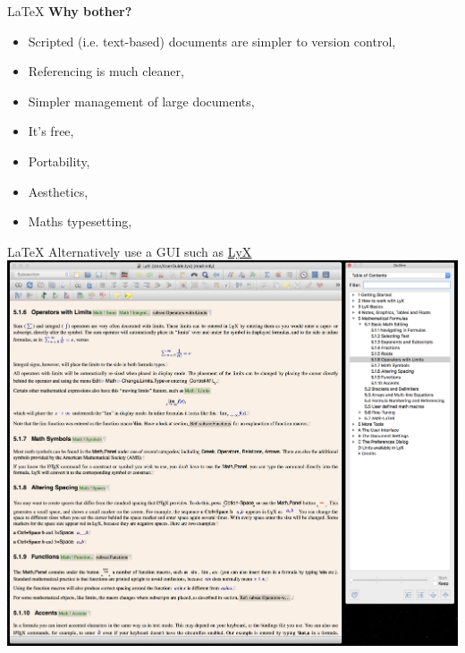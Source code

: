 \documentclass{beamer} %
\begin{document}
  \begin{frame}{\LaTeX}
    \textbf{Why bother?}
    \begin{itemize}
      \item Scripted (i.e. text-based) documents are simpler to version control,
      \item Referencing is much cleaner,
      \item Simpler management of large documents,
      \item It's free,
      \item Portability,
      \item Aesthetics,
      \item Maths typesetting,
    \end{itemize}
  \end{frame}

  \begin{frame}{\LaTeX}
    Alternatively use a GUI such as \href{https://www.lyx.org/}{LyX}
    \\
    \includegraphics[height=\textheight]{lyx.png}
  \end{frame}
  
\end{document}
